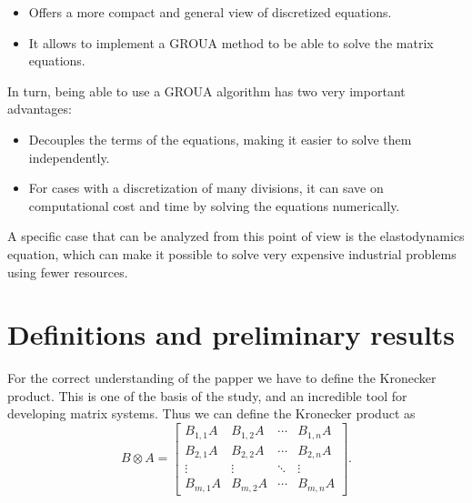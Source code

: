 \documentclass[a4paper, 10pt]{article}
\begin{document}
\begin{itemize}

    \item Offers a more compact and general view of discretized equations.
    
    \item  It allows to implement a GROUA method to be able to solve the matrix equations.
    
\end{itemize}  

In turn, being able to use a GROUA algorithm has two very important advantages:

\begin{itemize}
    
    \item Decouples the terms of the equations, making it easier to solve them independently.
    
    \item For cases with a discretization of many divisions, it can save on computational cost and time by solving the equations numerically.


\end{itemize}

A specific case that can be analyzed from this point of view is the elastodynamics equation, which can make it possible to solve very expensive industrial problems using fewer resources.


\section{Definitions and preliminary results}


For the correct understanding of the papper we have to define the Kronecker product. This is one of the basis of the study, and an incredible tool for developing matrix systems. Thus we can define the Kronecker product as
$$
B \otimes A = \left[
\begin{array}{cccc}
B_{1,1} A & B_{1,2} A & \cdots & B_{1,n}A \\
B_{2,1} A & B_{2,2} A & \cdots & B_{2,n}A \\
\vdots & \vdots & \ddots & \vdots \\ 
B_{m,1} A & B_{m,2} A & \cdots & B_{m,n}A
\end{array}
\right].
$$


\end{document}
